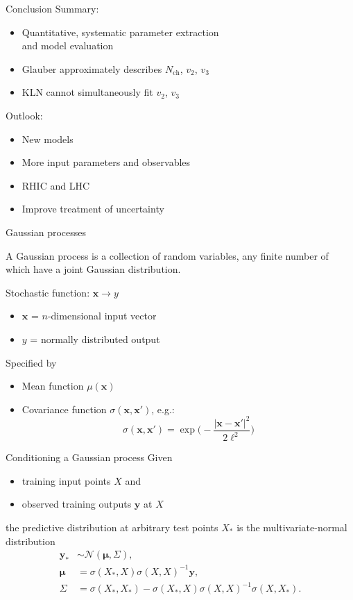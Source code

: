 \documentclass{beamer}
\newcommand{\nch}{N_\text{ch}}
\newcommand{\x}{\mathbf x}
\newcommand{\y}{\mathbf y}
\begin{document}
\begin{frame}{Conclusion}
  Summary:
  \begin{itemize}
    \item Quantitative, systematic parameter extraction \\ and model evaluation
    \item Glauber approximately describes $\nch$, $v_2$, $v_3$
    \item KLN cannot simultaneously fit $v_2$, $v_3$
  \end{itemize}
  \bigskip
  Outlook:
  \begin{itemize}
    \item New models
    \item More input parameters and observables
    \item RHIC and LHC
    \item Improve treatment of uncertainty
  \end{itemize}
\end{frame}


\appendix


\begin{frame}{Gaussian processes}
  \begin{definition}
    A Gaussian process is a collection of random variables, any finite number of which have a joint Gaussian distribution.
  \end{definition}
  \medskip
  Stochastic function: $\x \rightarrow y$ \\
  \begin{itemize}
    \item $\x$ = $n$-dimensional input vector
    \item $y$ = normally distributed output
  \end{itemize}
  Specified by
  \begin{itemize}
    \item Mean function $\mu(\x)$
    \item Covariance function $\sigma(\x, \x')$, e.g.:
      \begin{equation*}
        \sigma(\x, \x') = \exp\biggl( -\frac{|\x - \x'|^2}{2\ell^2} \biggr)
      \end{equation*}
  \end{itemize}
\end{frame}


\begin{frame}{Conditioning a Gaussian process}
  Given
  \begin{itemize}
    \item training input points $X$ and
    \item observed training outputs $\y$ at $X$
  \end{itemize}
  the predictive distribution at arbitrary test points $X_*$ is the multivariate-normal distribution
  \begin{align*}
    \y_* &\sim \mathcal N(\boldsymbol\mu, \Sigma), \\
    \boldsymbol\mu &= \sigma(X_*, X)\sigma(X, X)^{-1}\y, \\
    \Sigma &= \sigma(X_*,X_*) - \sigma(X_*,X)\sigma(X,X)^{-1}\sigma(X,X_*).
  \end{align*}
\end{frame}
\end{document}
